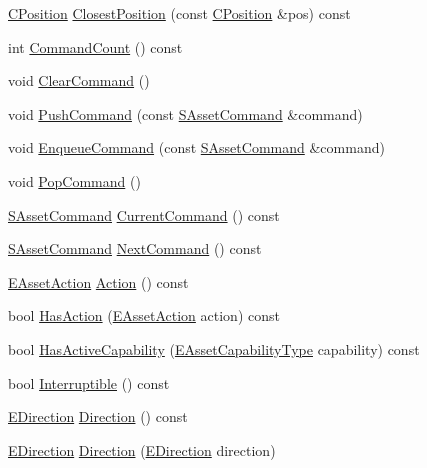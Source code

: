 \begin{DoxyCompactItemize}
\item 
\hyperlink{classCPosition}{C\+Position} \hyperlink{classCPlayerAsset_a67e700ce77122894c02da584dd652767}{Closest\+Position} (const \hyperlink{classCPosition}{C\+Position} \&pos) const
\item 
int \hyperlink{classCPlayerAsset_a5349f1cee794bd34f2255aa6b3177344}{Command\+Count} () const
\item 
void \hyperlink{classCPlayerAsset_ad4b1ea5ddba1c2b5dbee5ee5015e193b}{Clear\+Command} ()
\item 
void \hyperlink{classCPlayerAsset_ab7421ec7906d36f028484ff518cc3c90}{Push\+Command} (const \hyperlink{structSAssetCommand}{S\+Asset\+Command} \&command)
\item 
void \hyperlink{classCPlayerAsset_a92dcc002f1349cc41c7870495484a442}{Enqueue\+Command} (const \hyperlink{structSAssetCommand}{S\+Asset\+Command} \&command)
\item 
void \hyperlink{classCPlayerAsset_ae443fc4aa41aaa71d1d553f2ca9d9999}{Pop\+Command} ()
\item 
\hyperlink{structSAssetCommand}{S\+Asset\+Command} \hyperlink{classCPlayerAsset_ae2040e12e5319593c9a2d724c7b7eda0}{Current\+Command} () const
\item 
\hyperlink{structSAssetCommand}{S\+Asset\+Command} \hyperlink{classCPlayerAsset_aa7723b668d4278f23eb28ca8b6043192}{Next\+Command} () const
\item 
\hyperlink{GameDataTypes_8h_ab47668e651a3032cfb9c40ea2d60d670}{E\+Asset\+Action} \hyperlink{classCPlayerAsset_ad9a1fdc2ca221636ccab01891ea1f951}{Action} () const
\item 
bool \hyperlink{classCPlayerAsset_acd64c8a11af0f9d17b232d3e1e85dda1}{Has\+Action} (\hyperlink{GameDataTypes_8h_ab47668e651a3032cfb9c40ea2d60d670}{E\+Asset\+Action} action) const
\item 
bool \hyperlink{classCPlayerAsset_a6502fe94b663fb3729086ffad530d5ca}{Has\+Active\+Capability} (\hyperlink{GameDataTypes_8h_a35b98ce26aca678b03c6f9f76e4778ce}{E\+Asset\+Capability\+Type} capability) const
\item 
bool \hyperlink{classCPlayerAsset_a927a79955847918fa2807d37374b4fb6}{Interruptible} () const
\item 
\hyperlink{GameDataTypes_8h_acb2b033915f6659a71a38b5aa6e4eb42}{E\+Direction} \hyperlink{classCPlayerAsset_add74a452e9a030ae0d04d4281d964935}{Direction} () const
\item 
\hyperlink{GameDataTypes_8h_acb2b033915f6659a71a38b5aa6e4eb42}{E\+Direction} \hyperlink{classCPlayerAsset_abda0d14d43b52315a40defa0a6a2440f}{Direction} (\hyperlink{GameDataTypes_8h_acb2b033915f6659a71a38b5aa6e4eb42}{E\+Direction} direction)

\end{DoxyCompactItemize}
